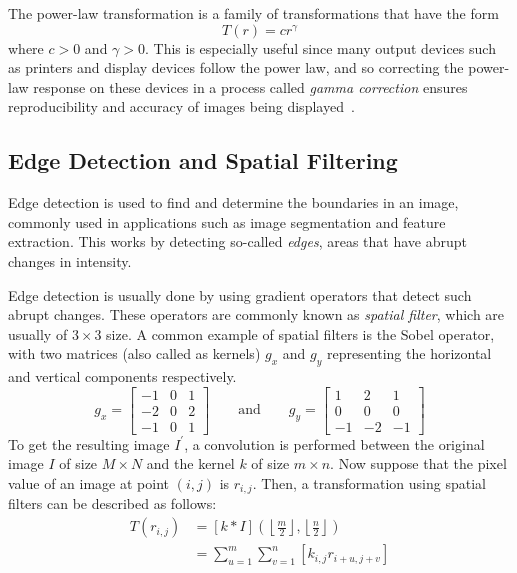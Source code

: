 The power-law transformation is a family of transformations that have the form
\begin{equation}
    T\left(r\right) = c r^{\gamma}
\end{equation}
where $c>0$ and $\gamma > 0$. This is especially useful since many output devices such as printers and display devices follow the power law, and so correcting the power-law response on these devices in a process called \textit{gamma correction} ensures reproducibility and accuracy of images being displayed~\cite{gonzalez_digital_2008}.

\subsection{Edge Detection and Spatial Filtering}
Edge detection is used to find and determine the boundaries in an image, commonly used in applications such as image segmentation and feature extraction. This works by detecting so-called \textit{edges}, areas that have abrupt changes in intensity.

Edge detection is usually done by using gradient operators that detect such abrupt changes. These operators are commonly known as \textit{spatial filter}, which are usually of $3 \times 3$ size. A common example of spatial filters is the Sobel operator, with two matrices (also called as kernels) $g_x$ and $g_y$ representing the horizontal and vertical components respectively.
\begin{equation}
    g_x =
    \begin{bmatrix}
        -1 & 0 & 1 \\
        -2 & 0 & 2 \\
        -1 & 0 & 1
    \end{bmatrix}
    \qquad\text{and}\qquad
    g_y =
    \begin{bmatrix}
        1 & 2 & 1 \\
        0 & 0 & 0 \\
        -1 & -2 & -1
    \end{bmatrix}
\end{equation}
To get the resulting image $I^\prime$, a convolution is performed between the original image $I$ of size $M \times N$ and the kernel $k$ of size $m \times n$. Now suppose that the pixel value of an image at point $\left(i,j\right)$ is $r_{i,j}$. Then, a transformation using spatial filters can be described as follows:
\begin{align}
    T\left(r_{i,j}\right) &= \left[k * I\right]\left(\left\lfloor\frac{m}{2}\right\rfloor, \left\lfloor\frac{n}{2}\right\rfloor \right) \\
                         &= \sum_{u=1}^{m} \sum_{v=1}^{n} \left[k_{i,j} r_{i+u, j+v} \right]
\end{align}

